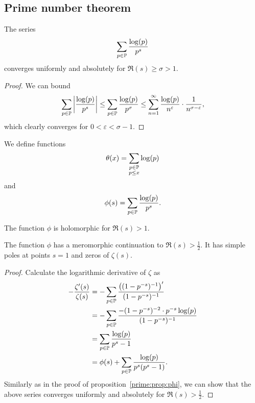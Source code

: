 \newpage

\subsection{Prime number theorem}

\begin{trditev}
\label{prime:prop:phi}
The series
\[
\sum_{p \in \P} \frac{\log(p)}{p^s}
\]
converges uniformly and absolutely for $\Re(s) \geq \sigma > 1$.
\end{trditev}

\begin{proof}
We can bound
\[
\sum_{p \in \P} \abs{\frac{\log(p)}{p^s}} \leq
\sum_{p \in \P} \frac{\log(p)}{p^\sigma} \leq
\sum_{n=1}^\infty \frac{\log(p)}{n^\varepsilon} \cdot
\frac{1}{n^{\sigma-\varepsilon}},
\]
which clearly converges for $0 < \varepsilon < \sigma-1$.
\end{proof}

\begin{definicija}
We define functions
\[
\theta(x) =
\sum_{\substack{p \in \P \\ p \leq x}} \log(p)
\]
and
\[
\phi(s) = \sum_{p \in \P} \frac{\log(p)}{p^s}.
\]
\end{definicija}

\begin{opomba}
The function $\phi$ is holomorphic for $\Re(s) > 1$.
\end{opomba}

\begin{trditev}
The function $\phi$ has a meromorphic continuation to
$\Re(s) > \frac{1}{2}$. It has simple poles at points $s=1$ and
zeros of $\zeta(s)$.
\end{trditev}

\begin{proof}
Calculate the logarithmic derivative of $\zeta$ as
\begin{align*}
- \frac{\zeta'(s)}{\zeta(s)} &=
-\sum_{p \in \P} \frac{\br{(1-p^{-s})^{-1}}'}{(1-p^{-s})^{-1}}
\\
&=
-\sum_{p \in \P}
\frac{-(1-p^{-s})^{-2} \cdot p^{-s} \log(p)}{(1-p^{-s})^{-1}}
\\
&=
\sum_{p \in \P} \frac{\log(p)}{p^s-1}
\\
&=
\phi(s) + \sum_{p \in \P} \frac{\log(p)}{p^s(p^s-1)}.
\end{align*}
Similarly as in the proof of proposition~\ref{prime:prop:phi}, we
can show that the above series converges uniformly and absolutely
for $\Re(s) > \frac{1}{2}$.
\end{proof}

